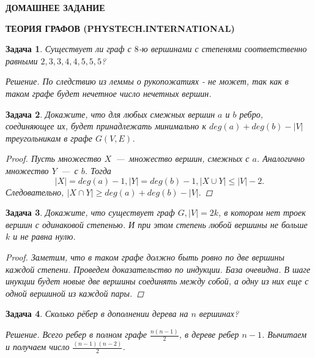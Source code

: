 \documentclass[12pt,a4paper,fleqn]{article}
\newtheorem{exersize}{Задача}
\begin{document}
\begin{center}
	\bf \Large ДОМАШНЕЕ ЗАДАНИЕ
	
	\bf \Large ТЕОРИЯ ГРАФОВ (PHYSTECH.INTERNATIONAL)
\end{center}

\begin{exersize}
	Существует ли граф с $8$-ю вершинами с степенями соответственно равными $2, 3, 3, 4, 4, 5, 5, 5$?
	
	\emph{Решение.} По следствию из леммы о рукопожатиях - не может, так как в таком графе будет нечетное число нечетных вершин.
\end{exersize}

\begin{exersize}
	Докажите, что для любых смежных вершин $a$ и $b$ ребро, соединяющее их, будет принадлежать минимально к $deg (a) + deg (b) - |V|$ треугольникам в графе $G(V, E)$.
	
\begin{proof}
	Пусть множество $X$~---~множество вершин, смежных с $a$. Аналогично множество $Y$~---~с $b$. Тогда $$|X| = deg(a) - 1, |Y| = deg(b) - 1, |X \cup Y| \leqslant |V| - 2.$$
	Следовательно, $|X \cap Y| \geqslant deg (a) + deg (b) - |V|.$
\end{proof}
\end{exersize}

\begin{exersize}
	Докажите, что существует граф $G, |V| = 2k$, в котором нет троек вершин с одинаковой степенью. И при этом степень любой вершины не больше $k$ и не равна нулю.

\begin{proof}
	Заметим, что в таком графе должно быть ровно по две вершины каждой степени. Проведем доказательство по индукции. База очевидна. В шаге инукции будет новые две вершины соединять между собой, а одну из них еще с одной вершиной из каждой пары.
\end{proof}
\end{exersize}

\begin{exersize}
	Сколько рёбер в дополнении дерева на $n$ вершинах?	
	
	\emph{Решение.} Всего ребер в полном графе $\frac{n(n-1)}{2}$, в дереве ребер $n-1$. Вычитаем и получаем число $\frac{(n-1)(n-2)}{2}$.
\end{exersize}	
\end{document}
